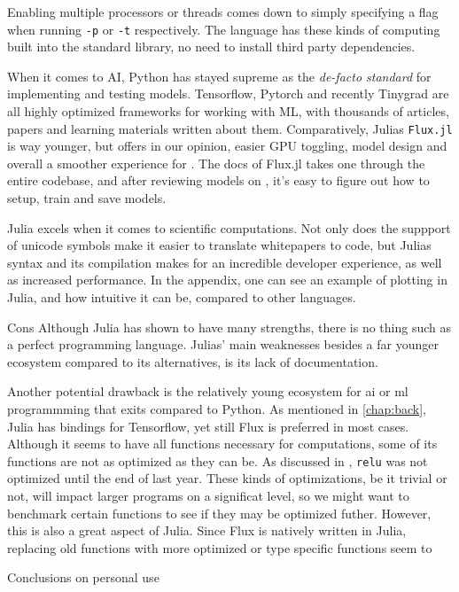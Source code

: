 Enabling multiple processors or threads comes down to simply specifying a flag when running \texttt{-p} or \texttt{-t} respectively. The language has these kinds of computing built into the standard library, no need to install third party dependencies. 

When it comes to AI, Python has stayed supreme as the \textit{de-facto standard} for implementing and testing models. Tensorflow, Pytorch and recently Tinygrad are all highly optimized frameworks for working with ML, with thousands of articles, papers and learning materials written about them. Comparatively, Julias \texttt{Flux.jl} is way younger, but offers in our opinion, easier GPU toggling, model design and overall a smoother experience for . The docs of Flux.jl takes one through the entire codebase, and after reviewing models on \cite{https://github.com/FluxML/model-zoo}, it's easy to figure out how to setup, train and save models.

Julia excels when it comes to scientific computations. Not only does the suppport of unicode symbols make it easier to translate whitepapers to code, but Julias syntax and its compilation makes for an incredible developer experience, as well as increased performance. In the appendix, one can see an example of plotting in Julia, and how intuitive it can be, compared to other languages.






Cons
Although Julia has shown to have many strengths, there is no thing such as a perfect programming language. Julias' main weaknesses besides a far younger ecosystem compared to its alternatives, is its lack of documentation. 

Another potential drawback is the relatively young ecosystem for \acrshort{ai} or \acrshort{ml} programmming that exits compared to Python. As mentioned in \ref{chap:back}, Julia has bindings for Tensorflow, yet still Flux is preferred in most cases. Although it seems to have all functions necessary for computations, some of its functions are not as optimized as they can be. As discussed in \cite{projthesis}, \lstinline|relu| was not optimized until the end of last year. These kinds of optimizations, be it trivial or not, will impact larger programs on a significat level, so we might want to benchmark certain functions to see if they may be optimized futher. However, this is also a great aspect of Julia. Since Flux is natively written in Julia, replacing old functions with more optimized or type specific functions seem to  


Conclusions on personal use 